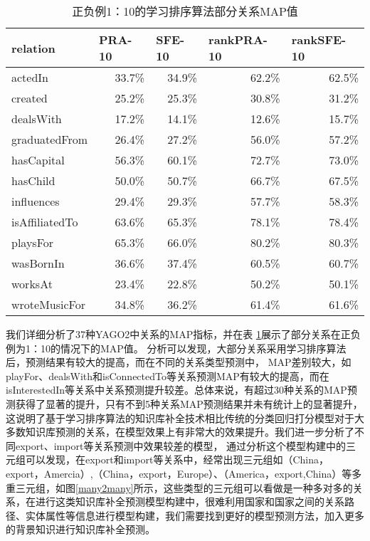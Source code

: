\begin{table}[htbp]
  \centering
  \caption{正负例1：10的学习排序算法部分关系MAP值}
    \begin{tabular}{|l|r|r|r|r|}
    \hline
    relation & \multicolumn{1}{l|}{PRA-10} & \multicolumn{1}{l|}{SFE-10} & \multicolumn{1}{l|}{rankPRA-10} & \multicolumn{1}{l|}{rankSFE-10} \\
    \hline
    actedIn & 33.7\%  & 34.9\%  & 62.2\%  & 62.5\%  \\
    \hline
    created & 25.2\%  & 25.3\%  & 30.8\%  & 31.2\%  \\
    \hline
    dealsWith & 17.2\%  & 14.1\%  & 12.6\%  & 15.7\%  \\
    \hline
    graduatedFrom & 26.4\%  & 27.2\%  & 56.0\%  & 57.2\%  \\
    \hline
    hasCapital & 56.3\%  & 60.1\%  & 72.7\%  & 73.0\%  \\
    \hline
    hasChild & 50.0\%  & 50.7\%  & 66.7\%  & 67.5\%  \\
    \hline
    influences & 29.4\%  & 29.3\%  & 57.7\%  & 58.3\%  \\
    \hline
    isAffiliatedTo & 63.6\%  & 65.3\%  & 78.1\%  & 78.4\%  \\
    \hline
    playsFor & 65.3\%  & 66.0\%  & 80.2\%  & 80.3\%  \\
    \hline
    wasBornIn & 36.6\%  & 37.4\%  & 60.5\%  & 60.7\%  \\
    \hline
    worksAt & 23.4\%  & 22.8\%  & 50.2\%  & 50.1\%  \\
    \hline
    wroteMusicFor & 34.8\%  & 36.2\%  & 61.4\%  & 61.6\%  \\
    \hline
    \end{tabular}%
  \label{kbc-yago-rank10}%
\end{table}%

我们详细分析了37种YAGO2中关系的MAP指标，并在表 \ref{kbc-yago-rank10}展示了部分关系在正负例为1：10的情况下的MAP值。
分析可以发现，大部分关系采用学习排序算法后，预测结果有较大的提高，而在不同的关系类型预测中，
MAP差别较大，如playFor、dealsWith和isConnectedTo等关系预测MAP有较大的提高，而在isInterestedIn等关系中关系预测提升较差。总体来说，有超过30种关系的MAP预测获得了显著的提升，只有不到5种关系MAP预测结果并未有统计上的显著提升，这说明了基于学习排序算法的知识库补全技术相比传统的分类回归打分模型对于大多数知识库预测的关系，在模型效果上有非常大的效果提升。我们进一步分析了不同export、import等关系预测中效果较差的模型，
通过分析这个模型构建中的三元组可以发现，在export和import等关系中，经常出现三元组如（China，export，Amercia）,（China，export，Europe）、（America，export,China）等多重三元组，如图\ref{many2many}所示，这些类型的三元组可以看做是一种多对多的关系，在进行这类知识库补全预测模型构建中，很难利用国家和国家之间的关系路径、实体属性等信息进行模型构建，我们需要找到更好的模型预测方法，加入更多的背景知识进行知识库补全预测。

